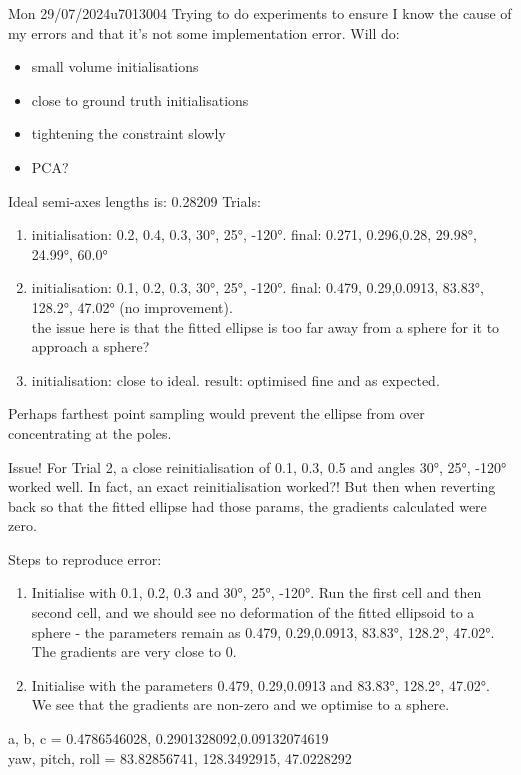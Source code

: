 \documentclass{project-logbook}
\begin{document}
	\begin{MeetingMinutes}{Mon 29/07/2024}{u7013004}
		Trying to do experiments to ensure I know the cause of my errors and that it's not some implementation error.
		Will do:
		\begin{itemize}
			\item small volume initialisations
			\item close to ground truth initialisations
			\item tightening the constraint slowly
			\item PCA?
		\end{itemize} 
		Ideal semi-axes lengths is: 0.28209
		Trials:
		\begin{enumerate}
			\item initialisation: 0.2, 0.4, 0.3, 30°, 25°, -120°. final: 0.271, 0.296,0.28, 29.98°, 24.99°, 60.0°
			\item initialisation: 0.1, 0.2, 0.3, 30°, 25°, -120°. final: 0.479, 0.29,0.0913, 83.83°, 128.2°, 47.02° (no improvement).
				 \\ the issue here is that the fitted ellipse is too far away from a sphere for it to approach a sphere?
			\item initialisation: close to ideal. result: optimised fine and as expected.
		\end{enumerate}
		Perhaps farthest point sampling would prevent the ellipse from over concentrating at the poles.

		Issue! For Trial 2, a close reinitialisation of 0.1, 0.3, 0.5 and angles 30°, 25°, -120° worked well. In fact, an exact reinitialisation worked?! But then when reverting back so that the fitted ellipse had those params, the gradients calculated were zero.

		Steps to reproduce error:
		\begin{enumerate}
			\item Initialise with 0.1, 0.2, 0.3 and 30°, 25°, -120°. Run the first cell and then second cell, and we should see no deformation of the fitted ellipsoid to a sphere - the parameters remain as 0.479, 0.29,0.0913, 83.83°, 128.2°, 47.02°. The gradients are very close to 0.
			\item Initialise with the parameters 0.479, 0.29,0.0913 and 83.83°, 128.2°, 47.02°. We see that the gradients are non-zero and we optimise to a sphere.
		\end{enumerate}
		a, b, c = 0.4786546028, 0.2901328092,0.09132074619 \\ 
		yaw, pitch, roll = 83.82856741, 128.3492915, 47.0228292
	\end{MeetingMinutes}
\end{document}
